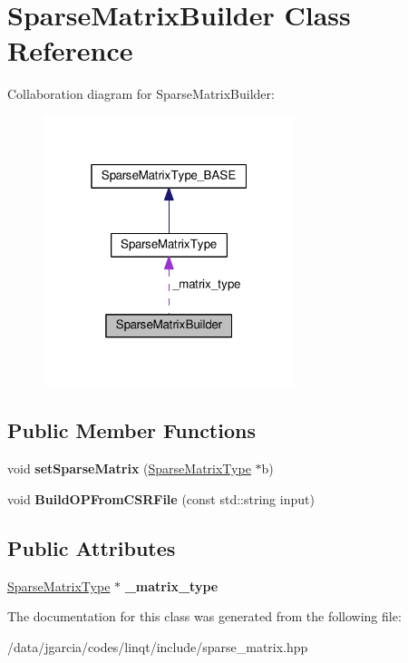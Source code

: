 \hypertarget{class_sparse_matrix_builder}{}\section{Sparse\+Matrix\+Builder Class Reference}
\label{class_sparse_matrix_builder}


Collaboration diagram for Sparse\+Matrix\+Builder\+:\nopagebreak
\begin{figure}[H]
\begin{center}
\leavevmode
\includegraphics[width=208pt]{class_sparse_matrix_builder__coll__graph}
\end{center}
\end{figure}
\subsection*{Public Member Functions}
\begin{DoxyCompactItemize}
\item 
void {\bfseries set\+Sparse\+Matrix} (\hyperlink{class_sparse_matrix_type}{Sparse\+Matrix\+Type} $\ast$b)\hypertarget{class_sparse_matrix_builder_acff4421ec6c4ef6eac4369f7fb6d8bc3}{}\label{class_sparse_matrix_builder_acff4421ec6c4ef6eac4369f7fb6d8bc3}

\item 
void {\bfseries Build\+O\+P\+From\+C\+S\+R\+File} (const std\+::string input)\hypertarget{class_sparse_matrix_builder_a67bd43b1c8589a74e8fc4ce5a70833cb}{}\label{class_sparse_matrix_builder_a67bd43b1c8589a74e8fc4ce5a70833cb}

\end{DoxyCompactItemize}
\subsection*{Public Attributes}
\begin{DoxyCompactItemize}
\item 
\hyperlink{class_sparse_matrix_type}{Sparse\+Matrix\+Type} $\ast$ {\bfseries \+\_\+matrix\+\_\+type}\hypertarget{class_sparse_matrix_builder_a394a74020200798f3cbbece2a0279252}{}\label{class_sparse_matrix_builder_a394a74020200798f3cbbece2a0279252}

\end{DoxyCompactItemize}


The documentation for this class was generated from the following file\+:\begin{DoxyCompactItemize}
\item 
/data/jgarcia/codes/linqt/include/sparse\+\_\+matrix.\+hpp\end{DoxyCompactItemize}

